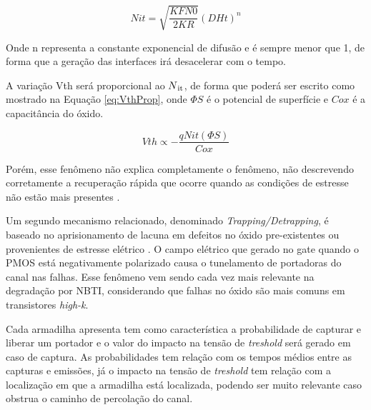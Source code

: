 \begin{equation}
    \label{eq:ResultanteRD}
    N{\scriptstyle it} = \sqrt{\frac{K{\scriptstyle F}N{\scriptstyle 0}}{2K{\scriptstyle R}}}(D{\scriptstyle H}t)^{n}
\end{equation}

Onde n representa a constante exponencial de difusão e é sempre menor que 1, de forma que a geração das interfaces irá desacelerar com o tempo.

A variação Vth será proporcional ao $N\textsubscript{it}$, de forma que poderá ser escrito como mostrado na Equação \ref{eq:VthProp}, onde $\Phi\scriptstyle{S}$ é o potencial de superfície e $C{\scriptstyle ox}$ é a capacitância do óxido.

\begin{equation}
    \label{eq:VthProp}
    V{\scriptstyle th} \propto - \frac{qN{\scriptstyle it}(\Phi{\scriptstyle S})}{C{\scriptstyle ox}}
\end{equation}

Porém, esse fenômeno não explica completamente o fenômeno, não descrevendo corretamente a recuperação rápida que ocorre quando as condições de estresse não estão mais presentes \cite{Gilson}.

Um segundo mecanismo relacionado, denominado \textit{Trapping/Detrapping}, é baseado no aprisionamento de lacuna em defeitos no óxido pre-existentes ou provenientes de estresse elétrico \cite{Butzen}. O campo elétrico que gerado no gate quando o PMOS está negativamente polarizado causa o tunelamento de portadoras do canal nas falhas. Esse fenômeno vem sendo cada vez mais relevante na degradação por NBTI, considerando que falhas no óxido são mais comuns em transistores \textit{high-k}.

Cada armadilha apresenta tem como característica a probabilidade de capturar e liberar um portador e o valor do impacto na tensão de \textit{treshold} será gerado em caso de captura. As probabilidades tem relação com os tempos médios entre as capturas e emissões, já o impacto na tensão de \textit{treshold} tem relação com a localização em que a armadilha está localizada, podendo ser muito relevante caso obstrua o caminho de percolação do canal. 


